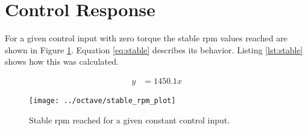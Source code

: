 \documentclass{article}
\begin{document}
\clearpage
\section{Control Response}
\label{app:contrpm}

For a given control input with zero torque the stable rpm values reached
are shown in Figure \ref{fig:stable}.
Equation \ref{eq:stable} describes its behavior.
Listing \ref{lst:stable} shows how this was calculated.

\begin{align}
y &= 1450.1 x \label{eq:stable}
\end{align}

\begin{figure}[htbp!]
\begin{center}
\texttt{[image: ../octave/stable\_rpm\_plot]}
\end{center}
\caption{Stable rpm reached for a given constant control input.}
\label{fig:stable}
\end{figure}

\clearpage

\end{document}
